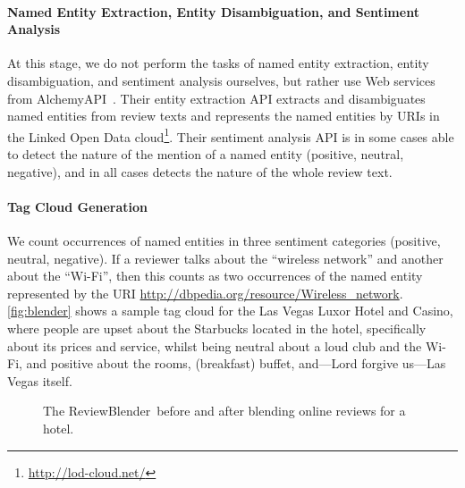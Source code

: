 \documentclass[runningheads,a4paper]{llncs}
\begin{document}
\paragraph{Named Entity Extraction, Entity Disambiguation, and Sentiment Analysis}
At this stage, we do not perform the tasks of named entity extraction, entity disambiguation, and sentiment analysis ourselves, but rather use Web services from AlchemyAPI~\cite{alchemyapi2011}. Their entity extraction API extracts and disambiguates named entities from review texts and represents the named entities by URIs in the Linked Open Data cloud\footnote{\url{http://lod-cloud.net/}}. Their sentiment analysis API is in some cases able to detect the nature of the mention of a named entity (positive, neutral, negative), and in all cases detects the nature of the whole review text.

\paragraph{Tag Cloud Generation}
We count occurrences of named entities in three sentiment categories (positive, neutral, negative). If a reviewer talks about the ``wireless network'' and another about the ``Wi-Fi'', then this counts as two occurrences of the named entity represented by the URI \url{http://dbpedia.org/resource/Wireless_network}. \autoref{fig:blender} shows a sample tag cloud for the Las Vegas Luxor Hotel and Casino, where people are upset about the Starbucks located in the hotel, specifically about its prices and service, whilst being neutral about a loud club and the Wi-Fi, and positive about the rooms, (breakfast) buffet, and---Lord forgive us---Las Vegas itself.

\vspace{-5mm}
\begin{figure}[h]
  \begin{center}
\hspace{10pt}
  \caption{The ReviewBlender\texttrademark \ before and after blending online reviews for a hotel.}
  \label{fig:blender}
  \end{center}  
\end{figure}
\end{document}

